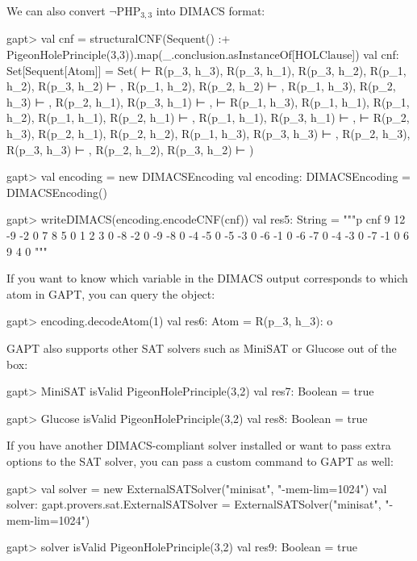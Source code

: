\documentclass[a4paper,11pt]{book}
\newcommand{\cli}[1]{{\ttfamily {#1}}}
\begin{document}
We can also convert $\neg\mathrm{PHP}_{3,3}$ into DIMACS format:
\begin{clilisting}
gapt> val cnf = structuralCNF(Sequent() :+ PigeonHolePrinciple(3,3)).map(_.conclusion.asInstanceOf[HOLClause])
val cnf: Set[Sequent[Atom]] = Set(
   ⊢ R(p_3, h_3), R(p_3, h_1), R(p_3, h_2),
  R(p_1, h_2), R(p_3, h_2) ⊢ ,
  R(p_1, h_2), R(p_2, h_2) ⊢ ,
  R(p_1, h_3), R(p_2, h_3) ⊢ ,
  R(p_2, h_1), R(p_3, h_1) ⊢ ,
   ⊢ R(p_1, h_3), R(p_1, h_1), R(p_1, h_2),
  R(p_1, h_1), R(p_2, h_1) ⊢ ,
  R(p_1, h_1), R(p_3, h_1) ⊢ ,
   ⊢ R(p_2, h_3), R(p_2, h_1), R(p_2, h_2),
  R(p_1, h_3), R(p_3, h_3) ⊢ ,
  R(p_2, h_3), R(p_3, h_3) ⊢ ,
  R(p_2, h_2), R(p_3, h_2) ⊢ 
)

gapt> val encoding = new DIMACSEncoding
val encoding: DIMACSEncoding = DIMACSEncoding()

gapt> writeDIMACS(encoding.encodeCNF(cnf))
val res5: String = """p cnf 9 12
-9 -2 0
7 8 5 0
1 2 3 0
-8 -2 0
-9 -8 0
-4 -5 0
-5 -3 0
-6 -1 0
-6 -7 0
-4 -3 0
-7 -1 0
6 9 4 0
"""

\end{clilisting}

If you want to know which variable in the DIMACS output corresponds to which
atom in GAPT, you can query the \cli{DIMACSEncoding} object:
\begin{clilisting}
gapt> encoding.decodeAtom(1)
val res6: Atom = R(p_3, h_3): o

\end{clilisting}

GAPT also supports other SAT solvers such as MiniSAT or Glucose out of the box:
\begin{clilisting}
gapt> MiniSAT isValid PigeonHolePrinciple(3,2)
  val res7: Boolean = true

\end{clilisting}
\begin{clilisting}
gapt> Glucose isValid PigeonHolePrinciple(3,2)
  val res8: Boolean = true

\end{clilisting}

If you have another DIMACS-compliant solver installed or want to pass extra
options to the SAT solver, you can pass a custom command to GAPT as well:
\begin{clilisting}
gapt> val solver = new ExternalSATSolver("minisat", "-mem-lim=1024")
  val solver: gapt.provers.sat.ExternalSATSolver = ExternalSATSolver("minisat", "-mem-lim=1024")

gapt> solver isValid PigeonHolePrinciple(3,2)
  val res9: Boolean = true

\end{clilisting}
\end{document}
